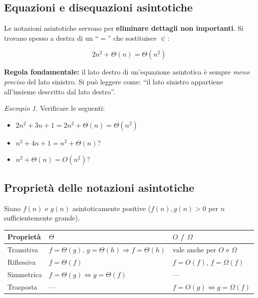 \documentclass[a4paper, 11pt]{article}
\theoremstyle{definition}
\theoremstyle{remark}
\newtheorem{esempio}{Esempio}[section]
\theoremstyle{remark}
\newenvironment{nota}{%
	\begin{tcolorbox}[
		colback=codebg,
		colframe=primary,
		fonttitle=\bfseries,
		title=Nota,
		left=6pt, right=6pt, top=4pt, bottom=4pt
		]
	}{%
	\end{tcolorbox}
}
\begin{document}
	\subsection{Equazioni e disequazioni asintotiche}
	
	Le notazioni asintotiche servono per \textbf{eliminare dettagli non
		importanti}. Si trovano spesso a destra di un ``$=$'' che sostituisce
	$\in$:
	
	\[
	2n^2 + \Theta(n) = \Theta(n^2)
	\]
	
	\begin{nota}
		\textbf{Regola fondamentale:} il lato destro di un'equazione
		asintotica è sempre \textit{meno preciso} del lato sinistro.
		Si può leggere come: ``il lato sinistro appartiene all'insieme
		descritto dal lato destro''.
	\end{nota}
	
	\begin{esempio}
		Verificare le seguenti:
		\begin{itemize}
			\item $2n^2 + 3n + 1 = 2n^2 + \Theta(n) = \Theta(n^2)$ \quad \checkmark
			\item $n^2 + 4n + 1 = n^2 + \Theta(n)$? \quad \checkmark
			\item $n^2 + \Theta(n) = O(n^2)$? \quad \checkmark
		\end{itemize}
	\end{esempio}
	
	\subsection{Proprietà delle notazioni asintotiche}
	
	Siano $f(n)$ e $g(n)$ asintoticamente positive ($f(n), g(n) > 0$
	per $n$ sufficientemente grande).
	
	\begin{center}
		\renewcommand{\arraystretch}{1.3}
		\begin{tabular}{lll}
			\toprule
			\textbf{Proprietà} & \textbf{$\Theta$} & \textbf{$O$ / $\Omega$} \\
			\midrule
			Transitiva & $f\!=\!\Theta(g),\,g\!=\!\Theta(h) \Rightarrow f\!=\!\Theta(h)$
			& vale anche per $O$ e $\Omega$ \\
			Riflessiva & $f = \Theta(f)$ & $f=O(f)$, $f=\Omega(f)$ \\
			Simmetrica & $f=\Theta(g) \Leftrightarrow g=\Theta(f)$ & — \\
			Trasposta  & — & $f=O(g) \Leftrightarrow g=\Omega(f)$ \\
			\bottomrule
		\end{tabular}
	\end{center}
	
\end{document}
